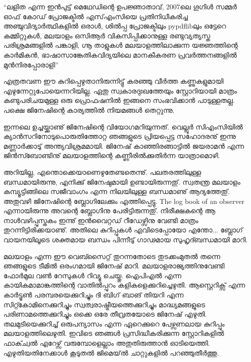 {\vskip 2pt}

\begin{framed}
``ലളിത എന്ന ഇന്‍പുട്ട് മെഥേഡിന്റെ ഉപജ്ഞാതാവ്, 2007ലെ ഗൂഗിള്‍ സമ്മര്‍ ഓഫ് കോഡ് പ്രോജക്ടില്‍ എസ്എംസിയെ 
പ്രതിനിധീകരിച്ച അഞ്ചുവിദ്യാര്‍ത്ഥികളില്‍ ഒരാള്‍, ശില്‍പ്പ പ്രോജക്ടിലും pypdflibലും ഒട്ടേറെ കമ്മിറ്റുകള്‍, മലയാളം ഒസിആര്‍ 
വികസിപ്പിക്കാനുള്ള രണ്ടുവ്യത്യസ്ത പരിശ്രമങ്ങളില്‍ പങ്കാളി, ഗ്നൂ താളുകള്‍ മലയാളത്തിലാക്കുന്ന യജ്ഞത്തിന്റെ കാര്‍മികന്‍, 
ഭാഷാസാങ്കേതികവിദ്യയിലെ മാനകീകരണ പ്രവര്‍ത്തനങ്ങളില്‍ മുന്‍നിരപ്പോരാളി''
\end{framed}

{\vskip 12pt}

എത്രതവണ ഈ കുറിപ്പെഴുതാനിരുന്നിട്ടു് കരഞ്ഞു വീര്‍ത്ത കണ്ണുകളുമായി എഴുന്നേറ്റുപോയെന്നറിയില്ല. ഏതു സ്വകാരദുഃഖത്തേയും
സ്റ്റോറിയായി മാത്രം കണ്ടുപരിചയമുള്ള ഒരു പ്രൊഫഷനില്‍ ഇങ്ങനെ സംഭവിക്കാന്‍ പാടുള്ളതല്ല. പക്ഷെ ജിനേഷിന്റെ കാര്യത്തില്‍ നിയമങ്ങള്‍ തെറ്റുന്നു.

ഇന്നലെ ഉച്ചയ്ക്കാണു് ജിനേഷിന്റെ വിയോഗമറിയുന്നത്. വെല്ലൂര്‍ സിഎംസിയില്‍ ക്യാന്‍സറിനോടുപൊരുതിത്തോറ്റ ഞങ്ങളുടെ 
പ്രിയപ്പെട്ട സഹോദരനു് ഇന്നു മണ്ണാര്‍ക്കാടു് അന്ത്യവിശ്രമമായി. ജിനേഷ് കാഞ്ഞിരങ്ങാട്ടില്‍ ജയരാമന്‍ എന്ന ജിന്‍സ്ബോണ്ടിനു്
മലയാളത്തിന്റെ കണ്ണീരില്‍ക്കുതിര്‍ന്ന യാത്രാമൊഴി.

അറിയില്ല, എന്തൊക്കെയാണെഴുതേണ്ടതെന്നു്. പലതരത്തിലുള്ള ബന്ധമായിരുന്നു, എനിക്കു് ജിനേഷുമായി ഉണ്ടായിരുന്നതു്. 
സ്വതന്ത്ര മലയാളം കമ്പ്യൂട്ടിങ്ങിലെ സജീവാംഗം എന്ന നിലയിലുള്ള ബന്ധമാണു് ആദ്യത്തേതു്. അതുവഴി ജിനേഷിന്റെ 
ബ്ലോഗിലേക്കും എത്തിപ്പെട്ടു. The log book of an observer എന്നായിരുന്നു അവന്റെ ബ്ലോഗിനു പേരിട്ടിരുന്നതു്. നിരീക്ഷകന്റെ 
ആ നാള്‍വഴിപ്പുസ്തകം ഇന്നു് ഇന്‍വൈറ്റഡ് റീഡേഴ്സിനു വേണ്ടി മാത്രം തുറന്നിട്ടിരിക്കയാണു്. അതിലെ കുറിപ്പുകള്‍ 
എവിടെപ്പോയോ എന്തോ... ബ്ലോഗ് വായനയിലൂടെ ശക്തമായ ബന്ധം പിന്നീടു് ഗാഢമായ സുഹൃദ്ബന്ധമായി മാറി.

മലയാളം എന്ന ഈ വെബ്സൈറ്റ് തുറന്നതോടെ തുടക്കംമുതല്‍ തന്നെ ഞങ്ങളുടെ ടീമില്‍ ഒരംഗമായി ജിനേഷ് മാറി. 
മലയാളരാജ്യത്തിനുവേണ്ടി ഫോര്‍മുല വണ്‍ റേസുകള്‍ റിവ്യൂ ചെയ്തു. ഐപിഎല്‍ എന്ന കായികമാമാങ്കത്തിന്റെ വാതില്‍പ്പുറം 
കളികളെക്കുറിച്ചെഴുതി. ആസ്റ്റെറിക്സ് എന്ന കാര്‍ട്ടൂണ്‍ പരമ്പരയെക്കുറിച്ചും ദി ബിഗ് ബാങ് തിയറി എന്ന സിറ്റ്കോമിനെക്കുറിച്ചും 
സ്വത്വരാഷ്ട്രീയത്തെക്കുറിച്ചും മാദ്ധ്യമങ്ങളുടെ പരിണാമത്തെക്കുറിച്ചും ഒക്കെ ഒരേ തീവ്രതയോടെ ജിനേഷ് എഴുതി. തലമുടിയെക്കുറിച്ച് 
ഒരുപന്യാസം എന്ന ഏറെക്കുറെ പേഴ്സണലായ കുറിപ്പും മലയാളത്തിലെഴുതി. ഇവിടെ ഞങ്ങള്‍ പ്രസിദ്ധീകരിക്കുന്ന സ്റ്റോറികളില്‍ 
ഫാക്ച്വല്‍ എറേഴ്സ് വരുമ്പോളെല്ലാം അതുതിരുത്താന്‍ ഓടിയെത്തി. എഴുതിയതിനേക്കാള്‍ കൂടുതല്‍ ജിമെയ്ല്‍ ചാറ്റുകളില്‍ 
പറഞ്ഞുതീര്‍ത്തു.

